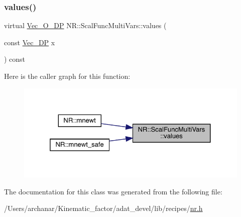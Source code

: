 \mbox{\label{classNR_1_1ScalFuncMultiVars_a5345ed027a649e71ae8ae3c8dadb436c}} 
\subsubsection{\texorpdfstring{values()}{values()}\hspace{0.1cm}{\footnotesize\ttfamily [2/2]}}
{\footnotesize\ttfamily virtual \mbox{\hyperlink{namespaceNR_a970094d23441f8ef6a45282a7eb2103d}{Vec\+\_\+\+O\+\_\+\+DP}} N\+R\+::\+Scal\+Func\+Multi\+Vars\+::values (\begin{DoxyParamCaption}\item[{const \mbox{\hyperlink{namespaceNR_a115a3196718c98e8e2562d80b06c23c5}{Vec\+\_\+\+DP}}}]{x }\end{DoxyParamCaption}) const\hspace{0.3cm}{\ttfamily [pure virtual]}}

Here is the caller graph for this function\+:\nopagebreak
\begin{figure}[H]
\begin{center}
\leavevmode
\includegraphics[width=325pt]{d5/d17/classNR_1_1ScalFuncMultiVars_a5345ed027a649e71ae8ae3c8dadb436c_icgraph}
\end{center}
\end{figure}


The documentation for this class was generated from the following file\+:\begin{DoxyCompactItemize}
\item 
/\+Users/archanar/\+Kinematic\+\_\+factor/adat\+\_\+devel/lib/recipes/\mbox{\hyperlink{lib_2recipes_2nr_8h}{nr.\+h}}\end{DoxyCompactItemize}
